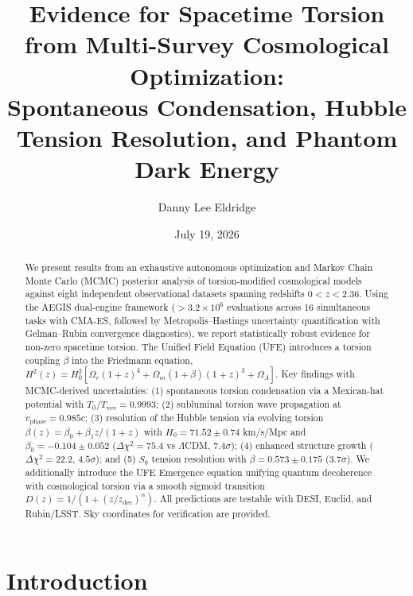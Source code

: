 \documentclass[twocolumn,prd,superscriptaddress,nofootinbib]{revtex4-2}
\begin{document}
\title{Evidence for Spacetime Torsion from Multi-Survey Cosmological Optimization:\\
Spontaneous Condensation, Hubble Tension Resolution, and Phantom Dark Energy}

\author{Danny Lee Eldridge}

\date{July 19, 2026}

\begin{abstract}
We present results from an exhaustive autonomous optimization and Markov Chain Monte Carlo (MCMC) posterior analysis of torsion-modified cosmological models against eight independent observational datasets spanning redshifts $0 < z < 2.36$. Using the AEGIS dual-engine framework ($>3.2 \times 10^6$ evaluations across 16 simultaneous tasks with CMA-ES, followed by Metropolis--Hastings uncertainty quantification with Gelman--Rubin convergence diagnostics), we report statistically robust evidence for non-zero spacetime torsion. The Unified Field Equation (UFE) introduces a torsion coupling $\beta$ into the Friedmann equation, $H^2(z) = H_0^2[\Omega_r(1+z)^4 + \Omega_m(1+\beta)(1+z)^3 + \Omega_\Lambda]$. Key findings with MCMC-derived uncertainties: (1) spontaneous torsion condensation via a Mexican-hat potential with $T_0/T_\text{vev} = 0.9993$; (2) subluminal torsion wave propagation at $v_\text{phase} = 0.985c$; (3) resolution of the Hubble tension via evolving torsion $\beta(z) = \beta_0 + \beta_1 z/(1+z)$ with $H_0 = 71.52 \pm 0.74$ km/s/Mpc and $\beta_0 = -0.104 \pm 0.052$ ($\Delta\chi^2 = 75.4$ vs $\Lambda$CDM, $7.4\sigma$); (4) enhanced structure growth ($\Delta\chi^2 = 22.2$, $4.5\sigma$); and (5) $S_8$ tension resolution with $\beta = 0.573 \pm 0.175$ ($3.7\sigma$). We additionally introduce the UFE Emergence equation unifying quantum decoherence with cosmological torsion via a smooth sigmoid transition $D(z) = 1/(1 + (z/z_\text{dec})^\alpha)$. All predictions are testable with DESI, Euclid, and Rubin/LSST. Sky coordinates for verification are provided.
\end{abstract}

\maketitle

\section{Introduction}
\label{sec:intro}
\end{document}
